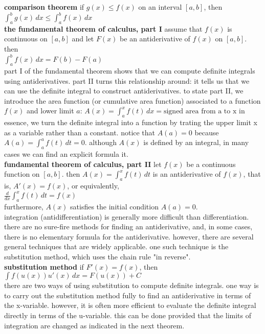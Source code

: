\documentclass{article}
\begin{document}
\textbf{comparison theorem} if $g(x) \leq f(x)$ on an interval $[a, b]$, then\\
$\int_{a}^{b}g(x)\,dx \leq \int_{a}^{b}f(x)\,dx$\\

\textbf{the fundamental theorem of calculus, part I} assume that $f(x)$ is continuous on $[a, b]$ and let $F(x)$ be an antiderivative of $f(x)$ on $[a, b]$. then\\
$\int_{a}^{b}f(x)\,dx = F(b) - F(a)$\\

part I of the fundamental theorem shows that we can compute definite integrals using antiderivatives. part II turns this relationship around: it tells us that we can use the definite integral to construct antiderivatives. to state part II, we introduce the area function (or cumulative area function) associated to a function $f(x)$ and lower limit $a$: $A(x) = \int_{a}^{x}f(t)\, dx = \text{signed area from a to x}$ in essence, we turn the definite integral into a function by trating the upper limit x as a variable rather than a constant. notice that $A(a) = 0$ because $A(a) = \int_{a}^{a}f(t)\,dt = 0$. although $A(x)$ is defined by an integral, in many cases we can find an explicit formula it.\\

\textbf{fundamental theorem of calculus, part II} let $f(x)$ be a continuous function on $[a, b]$. then $A(x) = \int_{a}^{x}f(t)\, dt$ is an antiderivative of $f(x)$, that is, $A'(x) = f(x)$, or equivalently,\\
$\frac{d}{dx}\int_{a}^{x}f(t)\,dt = f(x)$\\
furthermore, $A(x)$ satisfies the initial condition $A(a) = 0$.\\

integration (antidifferentiation) is generally more difficult than differentiation. there are no sure-fire methods for finding an antiderivative, and, in some cases, there is no elementary formula for the antiderivative. however, there are several general techniques that are widely applicable. one such technique is the substitution method, which uses the chain rule "in reverse".\\

\textbf{substitution method} if $F'(x) = f(x)$, then\\
$\int f(u(x))u'(x)\,dx = F(u(x)) + C$\\

there are two ways of using substitution to compute definite integrals. one way is to carry out the substitution method fully to find an antiderivative in terms of the x-variable. however, it is often more efficient to evaluate the definite integral directly in terms of the u-variable. this can be done provided that the limits of integration are changed as indicated in the next theorem.\\
\end{document}
